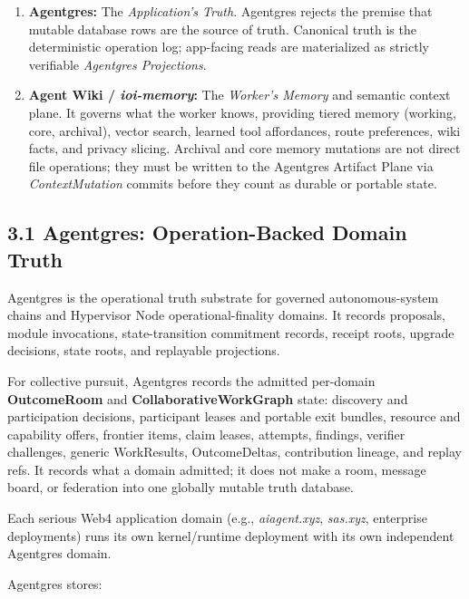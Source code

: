 \documentclass[
  11pt,
]{article}
\providecommand{\tightlist}{%
  \setlength{\itemsep}{0pt}\setlength{\parskip}{0pt}}
\begin{document}
\begin{enumerate}
\def\labelenumi{\arabic{enumi}.}
\tightlist
\item
  \textbf{Agentgres:} The \emph{Application's Truth}. Agentgres rejects
  the premise that mutable database rows are the source of truth.
  Canonical truth is the deterministic operation log; app-facing reads
  are materialized as strictly verifiable \emph{Agentgres Projections}.
\item
  \textbf{Agent Wiki / \emph{ioi-memory}:} The \emph{Worker's Memory}
  and semantic context plane. It governs what the worker knows,
  providing tiered memory (working, core, archival), vector search,
  learned tool affordances, route preferences, wiki facts, and privacy
  slicing. Archival and core memory mutations are not direct file
  operations; they must be written to the Agentgres Artifact Plane via
  \emph{ContextMutation} commits before they count as durable or
  portable state.
\end{enumerate}

\hypertarget{agentgres-operation-backed-domain-truth}{%
\subsection{3.1 Agentgres: Operation-Backed Domain
Truth}\label{agentgres-operation-backed-domain-truth}}

Agentgres is the operational truth substrate for governed
autonomous-system chains and Hypervisor Node operational-finality domains.
It records proposals, module invocations, state-transition commitment records,
receipt roots, upgrade decisions, state roots, and replayable
projections.

For collective pursuit, Agentgres records the admitted per-domain
\textbf{OutcomeRoom} and \textbf{CollaborativeWorkGraph} state: discovery and
participation decisions, participant leases and portable exit bundles,
resource and capability offers, frontier items, claim leases, attempts,
findings, verifier challenges, generic WorkResults, OutcomeDeltas,
contribution lineage, and replay refs. It records what a domain admitted; it
does not make a room, message board, or federation into one globally mutable
truth database.

Each serious Web4 application domain (e.g., \emph{aiagent.xyz},
\emph{sas.xyz}, enterprise deployments) runs its own kernel/runtime
deployment with its own independent Agentgres domain.

Agentgres stores:
\end{document}

